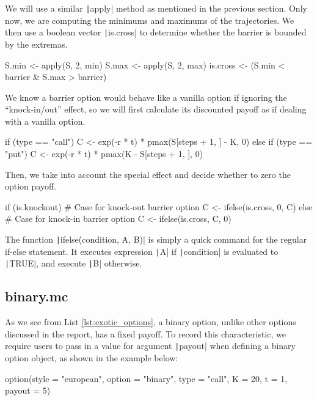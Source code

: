 We will use a similar \texttt|apply| method as mentioned in the previous section. Only now, we are computing the minimums and maximums of the trajectories. We then use a boolean vector \texttt|is.cross| to determine whether the barrier is bounded by the extremas.

\begin{Rminted}
S.min <- apply(S, 2, min)
S.max <- apply(S, 2, max)
is.cross <- (S.min < barrier & S.max > barrier)
\end{Rminted}

We know a barrier option would behave like a vanilla option if ignoring the ``knock-in/out'' effect, so we will first calculate its discounted payoff as if dealing with a vanilla option.

\begin{Rminted}
if (type == "call") {
    C <- exp(-r * t) * pmax(S[steps + 1, ] - K, 0)
} else if (type == "put") {
    C <- exp(-r * t) * pmax(K - S[steps + 1, ], 0)
}
\end{Rminted}

Then, we take into account the special effect and decide whether to zero the option payoff.

\begin{Rminted}
if (is.knockout) { # Case for knock-out barrier option
    C <- ifelse(is.cross, 0, C)
} else { # Case for knock-in barrier option
    C <- ifelse(is.cross, C, 0)
}
\end{Rminted}

The function \texttt|ifelse(condition, A, B)| is simply a quick command for the regular if-else statement. It executes expression \texttt|A| if \texttt|condition| is evaluated to \texttt|TRUE|, and execute \texttt|B| otherwise.

\subsection{binary.mc}

As we see from List \ref{lst:exotic_options}, a binary option, unlike other options discussed in the report, has a fixed payoff. To record this characteristic, we require users to pass in a value for argument \texttt|payout| when defining a binary option object, as shown in the example below:

\begin{Rminted}
option(style = "european", option = "binary", type = "call", K = 20, t = 1, payout = 5)
\end{Rminted}

